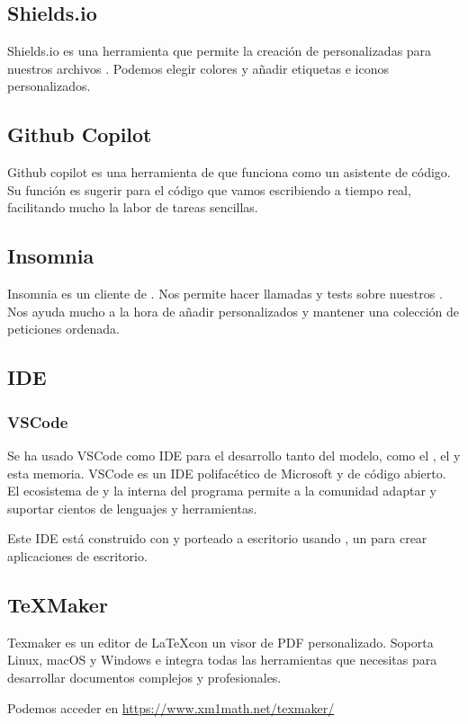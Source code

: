 \subsection{Shields.io}

Shields.io es una herramienta que permite la creación de  personalizadas para nuestros archivos . Podemos elegir colores y añadir etiquetas e iconos personalizados.

\subsection{Github Copilot}

Github copilot es una herramienta de  que funciona como un asistente de código. Su función es sugerir  para el código que vamos escribiendo a tiempo real, facilitando mucho la labor de tareas sencillas.

\subsection{Insomnia}

Insomnia es un cliente de . Nos permite hacer llamadas y tests sobre nuestros . Nos ayuda mucho a la hora de añadir  personalizados y mantener una colección de peticiones ordenada.

\subsection{IDE}

\subsubsection{VSCode}

Se ha usado VSCode como IDE para el desarrollo tanto del modelo, como el , el  y esta memoria. VSCode es un IDE polifacético de Microsoft y de código abierto. El ecosistema de  y la  interna del programa permite a la comunidad adaptar y suportar cientos de lenguajes y herramientas.

Este IDE está construido con  y porteado a escritorio usando , un  para crear aplicaciones de escritorio.

\subsection{\TeX Maker}

Texmaker es un editor de \LaTeX con un visor de PDF personalizado. Soporta Linux, macOS y Windows e integra todas las herramientas que necesitas para desarrollar documentos complejos y profesionales.

Podemos acceder en \url{https://www.xm1math.net/texmaker/}
